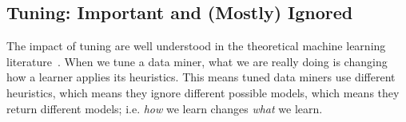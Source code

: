 \documentclass[twocolumn,5p,sort&compress]{elsarticle}
\theoremstyle{break}
\begin{document}





\subsection{Tuning: Important and (Mostly) Ignored}
\label{sect:tuning}

The impact of tuning are well understood in the theoretical machine learning literature~\cite{bergstra2012random}.  When we tune a
data miner, what we are really doing is changing how a learner applies its
heuristics. This means tuned data miners use different heuristics, which means
they ignore different possible models, which means they return different models;
i.e. \textit{how} we learn changes \textit{what} we learn.
\end{document}

